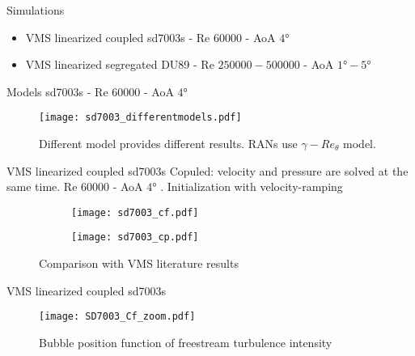 



\begin{frame}{Simulations}
\begin{itemize}
\item VMS linearized coupled sd7003s - Re $\num{60000}$ - AoA $\ang{4}$ 
\item VMS linearized segregated DU89 - Re $\num{250000}-\num{500000}$ - AoA $\ang{1}-\ang{5}$ 
\end{itemize}
\end{frame}

\begin{frame}{Models}
sd7003s - Re $\num{60000}$ - AoA $\ang{4}$ 
\begin{figure}[h]
     \centering          
         \texttt{[image:  sd7003\_differentmodels.pdf]}
         \caption{Different model provides different results. RANs use $\gamma -Re_ \theta$ model.}
     \end{figure} 
\end{frame}




\begin{frame}{VMS linearized coupled sd7003s}
Copuled: velocity and pressure are solved at the same time.
Re $\num{60000}$ - AoA $\ang{4}$ . Initialization with velocity-ramping
\begin{figure}[h]
     \centering          
     \begin{subfigure}[h]{0.45\textwidth}
              \centering
         \texttt{[image: sd7003\_cf.pdf]}
    \end{subfigure}
          \hfill
     \begin{subfigure}[h]{0.45\textwidth}
      \centering
         \texttt{[image: sd7003\_cp.pdf]}
     \end{subfigure}
\caption{Comparison with VMS literature results}
     \end{figure} 
     
\end{frame}

\begin{frame}{ VMS linearized coupled sd7003s}
\begin{figure}[h]
     \centering          
         \texttt{[image: SD7003\_Cf\_zoom.pdf]}
         \caption{Bubble position function of freestream turbulence intensity}
     \end{figure} 
\end{frame}




